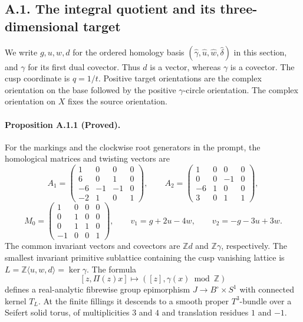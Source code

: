\subsection{A.1. The integral quotient and its three-dimensional target}

We write $g,u,w,d$ for the ordered homology basis
$(\widehat\gamma,\widehat u,\widehat w,\widehat\delta)$ in this
section, and $\gamma$ for its first dual covector.  Thus $d$ is a
vector, whereas $\gamma$ is a covector.  The cusp coordinate is
$q=1/t$.  Positive target orientations are the complex orientation
on the base followed by the positive $\gamma$-circle orientation.
The complex orientation on $X$ fixes the source orientation.

\paragraph{Proposition A.1.1 (Proved).}
For the markings and the clockwise root generators in the prompt,
the homological matrices and twisting vectors are
\[
 A_1=\begin{pmatrix}1&0&0&0\\6&0&1&0\\-6&-1&-1&0\\-2&1&0&1\end{pmatrix},
 \qquad
 A_2=\begin{pmatrix}1&0&0&0\\0&0&-1&0\\-6&1&0&0\\3&0&1&1\end{pmatrix},
\]
\[
 M_0=\begin{pmatrix}1&0&0&0\\0&1&0&0\\0&1&1&0\\-1&0&0&1\end{pmatrix},
 \qquad v_1=g+2u-4w,\qquad v_2=-g-3u+3w.
\]
The common invariant vectors and covectors are $\mathbb Zd$ and
$\mathbb Z\gamma$, respectively.  The smallest invariant primitive
sublattice containing the cusp vanishing lattice is
$L=\mathbb Z\langle u,w,d\rangle=\ker\gamma$.
The formula
\[
 [z,\Pi(z)x]\longmapsto([z],\gamma(x)\bmod\mathbb Z)
 \tag{A.1.1}
\]
defines a real-analytic fibrewise group epimorphism
$J\longrightarrow B^\circ\times S^1$ with connected kernel $T_L$.
At the finite fillings it descends to a smooth proper $T^3$-bundle
over a Seifert solid torus, of multiplicities $3$ and $4$ and
translation residues $1$ and $-1$.

